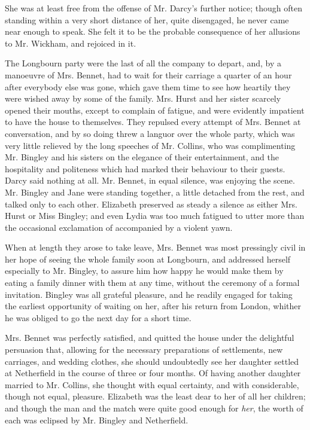 She was at least free from the offense of Mr. Darcy's further notice; though often standing within a very short distance of her, quite disengaged, he never came near enough to speak. She felt it to be the probable consequence of her allusions to Mr. Wickham, and rejoiced in it.

The Longbourn party were the last of all the company to depart, and, by a manoeuvre of Mrs. Bennet, had to wait for their carriage a quarter of an hour after everybody else was gone, which gave them time to see how heartily they were wished away by some of the family. Mrs. Hurst and her sister scarcely opened their mouths, except to complain of fatigue, and were evidently impatient to have the house to themselves. They repulsed every attempt of Mrs. Bennet at conversation, and by so doing threw a languor over the whole party, which was very little relieved by the long speeches of Mr. Collins, who was complimenting Mr. Bingley and his sisters on the elegance of their entertainment, and the hospitality and politeness which had marked their behaviour to their guests. Darcy said nothing at all. Mr. Bennet, in equal silence, was enjoying the scene. Mr. Bingley and Jane were standing together, a little detached from the rest, and talked only to each other. Elizabeth preserved as steady a silence as either Mrs. Hurst or Miss Bingley; and even Lydia was too much fatigued to utter more than the occasional exclamation of  accompanied by a violent yawn.

When at length they arose to take leave, Mrs. Bennet was most pressingly civil in her hope of seeing the whole family soon at Longbourn, and addressed herself especially to Mr. Bingley, to assure him how happy he would make them by eating a family dinner with them at any time, without the ceremony of a formal invitation. Bingley was all grateful pleasure, and he readily engaged for taking the earliest opportunity of waiting on her, after his return from London, whither he was obliged to go the next day for a short time.

Mrs. Bennet was perfectly satisfied, and quitted the house under the delightful persuasion that, allowing for the necessary preparations of settlements, new carriages, and wedding clothes, she should undoubtedly see her daughter settled at Netherfield in the course of three or four months. Of having another daughter married to Mr. Collins, she thought with equal certainty, and with considerable, though not equal, pleasure. Elizabeth was the least dear to her of all her children; and though the man and the match were quite good enough for {\em her}, the worth of each was eclipsed by Mr. Bingley and Netherfield.

